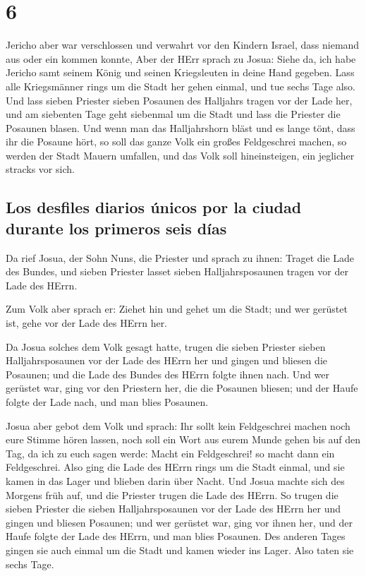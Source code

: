 \hypertarget{section-5}{%
\section{6}\label{section-5}}

 Jericho aber war verschlossen und verwahrt vor den
Kindern Israel, dass niemand aus oder ein kommen konnte, 
Aber der HErr sprach zu Josua: Siehe da, ich habe Jericho samt seinem
König und seinen Kriegsleuten in deine Hand gegeben.  Lass
alle Kriegsmänner rings um die Stadt her gehen einmal, und tue sechs
Tage also.  Und lass sieben Priester sieben Posaunen des
Halljahrs tragen vor der Lade her, und am siebenten Tage geht siebenmal
um die Stadt und lass die Priester die Posaunen blasen. 
Und wenn man das Halljahrshorn bläst und es lange tönt, dass ihr die
Posaune hört, so soll das ganze Volk ein großes Feldgeschrei machen, so
werden der Stadt Mauern umfallen, und das Volk soll hineinsteigen, ein
jeglicher stracks vor sich.

\hypertarget{los-desfiles-diarios-uxfanicos-por-la-ciudad-durante-los-primeros-seis-duxedas}{%
\subsection{Los desfiles diarios únicos por la ciudad durante los
primeros seis
días}\label{los-desfiles-diarios-uxfanicos-por-la-ciudad-durante-los-primeros-seis-duxedas}}

 Da rief Josua, der Sohn Nuns, die Priester und sprach zu
ihnen: Traget die Lade des Bundes, und sieben Priester lasset sieben
Halljahrsposaunen tragen vor der Lade des HErrn.

 Zum Volk aber sprach er: Ziehet hin und gehet um die
Stadt; und wer gerüstet ist, gehe vor der Lade des HErrn her.

 Da Josua solches dem Volk gesagt hatte, trugen die sieben
Priester sieben Halljahrsposaunen vor der Lade des HErrn her und gingen
und bliesen die Posaunen; und die Lade des Bundes des HErrn folgte ihnen
nach.  Und wer gerüstet war, ging vor den Priestern her,
die die Posaunen bliesen; und der Haufe folgte der Lade nach, und man
blies Posaunen.

 Josua aber gebot dem Volk und sprach: Ihr sollt kein
Feldgeschrei machen noch eure Stimme hören lassen, noch soll ein Wort
aus eurem Munde gehen bis auf den Tag, da ich zu euch sagen werde: Macht
ein Feldgeschrei! so macht dann ein Feldgeschrei.  Also
ging die Lade des HErrn rings um die Stadt einmal, und sie kamen in das
Lager und blieben darin über Nacht.  Und Josua machte
sich des Morgens früh auf, und die Priester trugen die Lade des HErrn.
 So trugen die sieben Priester die sieben
Halljahrsposaunen vor der Lade des HErrn her und gingen und bliesen
Posaunen; und wer gerüstet war, ging vor ihnen her, und der Haufe folgte
der Lade des HErrn, und man blies Posaunen.  Des anderen
Tages gingen sie auch einmal um die Stadt und kamen wieder ins Lager.
Also taten sie sechs Tage.


